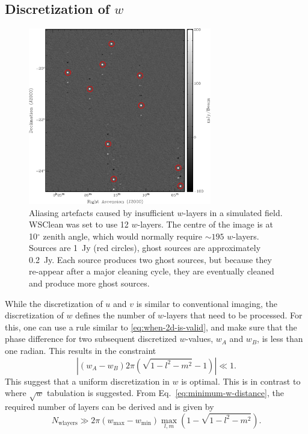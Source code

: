 \documentclass[useAMS,usenatbib]{mn2e}
\newcommand{\degree}{\ensuremath{^{\circ}}\xspace}
\begin{document}
\subsection{Discretization of $w$} \label{sec:gridding-w}
\begin{figure}
\begin{center}
\includegraphics[width=8cm]{img/aliasing-example-annotated}
\caption{Aliasing artefacts caused by insufficient $w$-layers in a simulated field. WSClean was set to use 12 $w$-layers. The centre of the image is at 10\degree zenith angle, which would normally require $\sim195$ $w$-layers. Sources are 1~Jy (red circles), ghost sources are approximately 0.2~Jy. Each source produces two ghost sources, but because they re-appear after a major cleaning cycle, they are eventually cleaned and produce more ghost sources. }
\label{fig:aliasing-example}
\end{center}
\end{figure}
While the discretization of $u$ and $v$ is similar to conventional imaging, the discretization of $w$ defines the number of $w$-layers that need to be processed. For this, one can use a rule similar to \eqref{eq:when-2d-is-valid}, and make sure that the phase difference for two subsequent discretized $w$-values, $w_A$ and $w_B$,  is less than one radian. This results in the constraint
\begin{equation} \label{eq:minimum-w-distance}
\left|\left(w_A - w_B\right) 2\pi (\sqrt{1-l^2-m^2}-1)\right| \ll 1.
\end{equation}
This suggest that a uniform discretization in $w$ is optimal. This is in contrast to \citet{wprojection-cornwell} where $\sqrt{w}$ tabulation is suggested. From Eq.~\eqref{eq:minimum-w-distance}, the required number of layers can be derived and is given by
\begin{equation} \label{eq:nwlayers-bound}
 N_\textrm{wlayers} \gg 2\pi \left(w_{\max} - w_{\min}\right) \max_{l,m} \left(1 - \sqrt{1-l^2-m^2}\right).
\end{equation}
\end{document}
